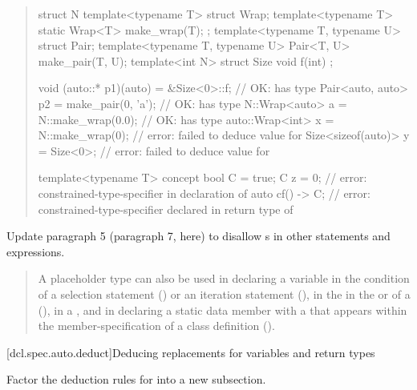 \begin{quote}
\begin{codeblock}
struct N {
  template<typename T> struct Wrap;
  template<typename T> static Wrap<T> make_wrap(T);
};
template<typename T, typename U> struct Pair;
template<typename T, typename U> Pair<T, U> make_pair(T, U);
template<int N> struct Size { void f(int) { }  };

void (auto::* p1)(auto) = &Size<0>::f;   // OK:  has type 
Pair<auto, auto> p2 = make_pair(0, 'a'); // OK:  has type 
N::Wrap<auto> a = N::make_wrap(0.0);     // OK:  has type 
auto::Wrap<int> x = N::make_wrap(0);     // error: failed to deduce value for 
Size<sizeof(auto)> y = Size<0>{};        // error: failed to deduce value for 

template<typename T> concept bool C = true;
C z = 0;        // error: constrained-type-specifier in declaration of 
auto cf() -> C; // error: constrained-type-specifier declared in return type of 
\end{codeblock}
\end{quote}


Update paragraph 5 (paragraph 7, here) to disallow 
s in other statements 
and expressions.

\begin{quote}
\pnum
A placeholder type can also be used in declaring a variable in the 
condition of a selection statement () or an iteration 
statement (), in the  in the 
 or  of a 
(), in a , and in declaring a 
static data member with a  that appears
within the member-specification of a class definition ().
% 
\end{quote}


% 
% 
[dcl.spec.auto.deduct]{Deducing replacements for variables and return types}

Factor the deduction rules for  into a new subsection.

